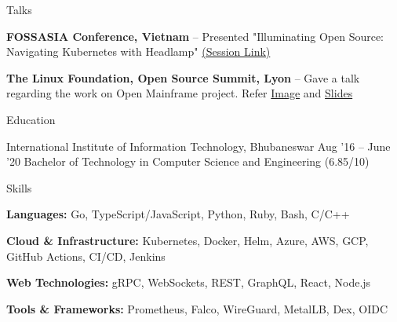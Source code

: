 \documentclass{resume} %
\begin{document}
\begin{rSection}{Talks}
\vspace{0.05cm}
  \begin{rProjectSection}
    \item \textbf{FOSSASIA Conference, Vietnam} -- Presented "Illuminating Open Source: Navigating Kubernetes with Headlamp" \href{https://eventyay.com/e/55d2a466/cfs/session/9010}{(Session Link)}
    \item \textbf{The Linux Foundation, Open Source Summit, Lyon} -- Gave a talk regarding the work on Open Mainframe project. Refer \href{https://user-images.githubusercontent.com/24803604/68012174-99a5a680-fc89-11e9-8c8e-800e68b8c231.jpeg}{Image} and \href{https://drive.google.com/file/d/1z2dhNwudUs8BYJRzIXL70UH7htLJasf0/view}{Slides}
  \end{rProjectSection}
\end{rSection}



\begin{rSection}{Education}
\vspace{0.05cm}
  \begin{rEducationSection}{International Institute of Information Technology, Bhubaneswar}
                           {Aug '16 -- June '20}
                           {Bachelor of Technology in Computer Science and Engineering (6.85/10)}
  \end{rEducationSection}
\end{rSection}


\begin{rSection}{Skills}
\vspace{0.05cm}
  \begin{rBlurbSection}
    \item \textbf{Languages:} Go, TypeScript/JavaScript, Python, Ruby, Bash, C/C++
    \item \textbf{Cloud \& Infrastructure:} Kubernetes, Docker, Helm, Azure, AWS, GCP, GitHub Actions, CI/CD, Jenkins
    \item \textbf{Web Technologies:} gRPC, WebSockets, REST, GraphQL, React, Node.js
    \item \textbf{Tools \& Frameworks:} Prometheus, Falco, WireGuard, MetalLB, Dex, OIDC
  \end{rBlurbSection}
\end{rSection}
\end{document}
